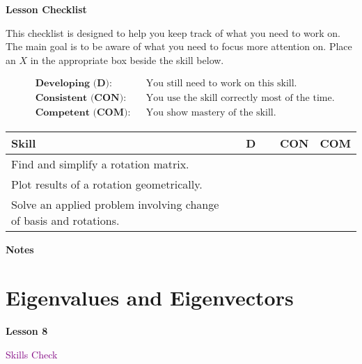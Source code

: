 \documentclass[10pt]{book}
\theoremstyle{definition}
\theoremstyle{remark}
\begin{document}
\begin{large}
\noindent
\textbf{Lesson Checklist}
\bigskip

\noindent
This checklist is designed to help you keep track of what you need to work on. The main goal is to be aware of what you need to focus more attention on. Place an $X$ in the appropriate box beside the skill below. 
\bigskip

\noindent
\begin{align*}
&\textbf{Developing (D):} &&\textrm{You still need to work on this skill.}\\
&\textbf{Consistent (CON):} &&\textrm{You use the skill correctly most of the time.}\\
&\textbf{Competent (COM):} &&\textrm{You show mastery of the skill.} 
\end{align*}
\vfil

\begin{center}
\begin{tabular}{|l|l|l|l|}
\hline
\textbf{Skill} & \textbf{~~D~~} & \textbf{CON} & \textbf{COM} \\
\hline
Find and simplify a rotation matrix.&&&\\
\hline
Plot results of a rotation geometrically.&&&\\
\hline
Solve an applied problem involving change of basis and rotations.&&&\\
\hline
\end{tabular}
\end{center}
 \vfil

\noindent
\textbf{Notes}
\end{large} \vfil
\newpage

\section{Eigenvalues and Eigenvectors}
\begin{tcolorbox}[
  width=\textwidth,
  colback=gray!10, %
  colframe=white, %
  boxrule=0pt,    %
  left=1cm,       %
  right=1cm,      %
  sharp corners  %
]

\begin{minipage}[t]{0.5\textwidth}
  \Huge \textbf{Lesson 8}
\end{minipage}%
\hfill
\begin{minipage}[t]{0.5\textwidth}
  \Huge \textcolor{purple}{Skills Check}
\end{minipage}
\end{tcolorbox}
\end{document}
